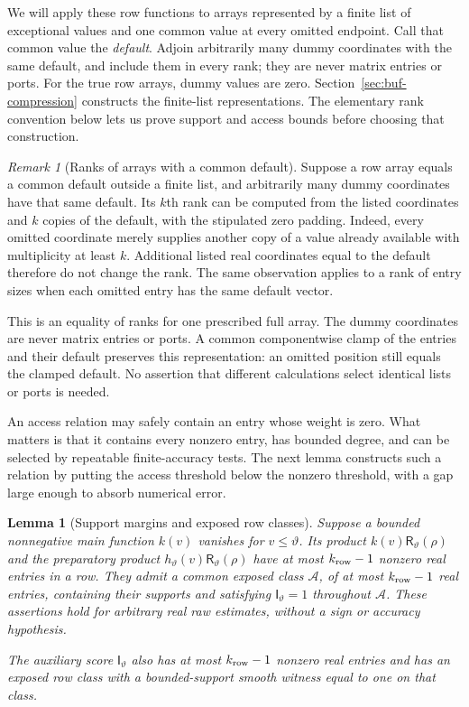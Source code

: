 \documentclass[11pt]{article}
\numberwithin{equation}{section}
\newtheorem{lemma}[theorem]{Lemma}
\theoremstyle{definition}
\theoremstyle{remark}
\newtheorem{remark}[theorem]{Remark}
\begin{document}
We will apply these row functions to arrays represented by a finite list
of exceptional values and one common value at every omitted endpoint.
Call that common value the \emph{default}.  Adjoin arbitrarily many dummy
coordinates with the same default, and include them in every rank; they
are never matrix entries or ports.  For the true row arrays, dummy values
are zero.  Section~\ref{sec:buf-compression} constructs the finite-list
representations.  The elementary rank convention below lets us prove
support and access bounds before choosing that construction.

\begin{remark}[Ranks of arrays with a common default]
\label{rem:atom-finite-ranks}
Suppose a row array equals a common default outside a finite list,
and arbitrarily many dummy coordinates have that same default.  Its
$k$th rank can be computed from the listed coordinates and $k$ copies of
the default, with the stipulated zero padding.  Indeed, every omitted
coordinate merely supplies another copy of a value already available
with multiplicity at least $k$.  Additional listed real coordinates
equal to the default therefore do not change the rank.  The same
observation applies to a rank of entry sizes when each omitted entry
has the same default vector.

This is an equality of ranks for one prescribed full array.  The dummy
coordinates are never matrix entries or ports.  A common componentwise
clamp of the entries and their default preserves this representation:
an omitted position still equals the clamped default.  No assertion
that different calculations select identical lists or ports is needed.
\end{remark}

An access relation may safely contain an entry whose weight is zero. What matters is that it contains every nonzero entry, has bounded degree, and can be selected by repeatable finite-accuracy tests. The next lemma constructs such a relation by putting the access threshold below the nonzero threshold, with a gap large enough to absorb numerical error.

\begin{lemma}[Support margins and exposed row classes]
\label{lem:atom-margins}
Suppose a bounded nonnegative main function $k(v)$ vanishes for
$v\le\vartheta$.  Its product $k(v){\mathsf{R}}_{\vartheta}(\rho)$ and the
preparatory product $h_{\vartheta}(v){\mathsf{R}}_{\vartheta}(\rho)$ have at most
${k_{\rm row}}-1$ nonzero real entries in a row.  They admit a common exposed class
${\mathcal{A}}$, of at most ${k_{\rm row}}-1$ real entries, containing their supports and satisfying
${\mathsf{I}}_{\vartheta}=1$ throughout ${\mathcal{A}}$.  These assertions hold for arbitrary
real raw estimates, without a sign or accuracy hypothesis.

The auxiliary score ${\mathsf{I}}_{\vartheta}$ also has at most ${k_{\rm row}}-1$ nonzero real
entries and has an exposed row class with a bounded-support smooth
witness equal to one on that class.
\end{lemma}
\end{document}
